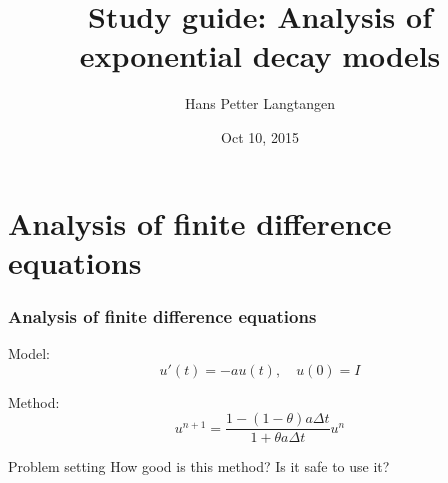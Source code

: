 \documentclass{beamer}
\begin{document}








\title{Study guide: Analysis of exponential decay models}


\author{Hans Petter Langtangen}

\date{Oct 10, 2015
}

\begin{frame}
\titlepage
\end{frame}

\section{Analysis of finite difference equations}

\begin{frame}
\frametitle{Analysis of finite difference equations}

\label{decay:analysis}

Model:
\begin{equation}
u'(t) = -au(t),\quad u(0)=I
\end{equation}

Method:
\begin{equation}
u^{n+1} = \frac{1 - (1-\theta) a\Delta t}{1 + \theta a\Delta t}u^n
\label{decay:analysis:scheme}
\end{equation}

\begin{block}{Problem setting }
How good is this method? Is it safe to use it?
\end{block}


\end{frame}
\end{document}

